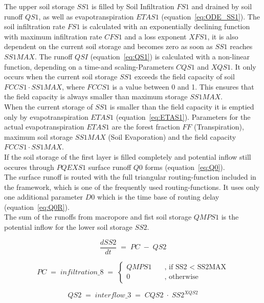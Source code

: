 \documentclass[11pt,color]{tudbook}
\begin{document}
\begin{onehalfspacing}
The upper soil storage $SS1$ is filled by Soil Infiltration $FS1$ and drained by soil runoff $QS1$, as well as evapotranspiration $ETAS1$ (equation~\ref{eq:ODE_SS1}).
The soil infiltration rate $FS1$ is calculated with an exponentially declining function with maximum infiltration rate $CFS1$ and a loss exponent $XFS1$, it is also dependent on the current soil storage and becomes zero as soon as $SS1$ reaches $SS1MAX$.
The runoff $QSI$ (equation~\ref{eq:QS1}) is  calculated with a non-linear function, depending on a time-and scaling-Parameters $CQS1$ and $XQS1$. It only occurs when the current soil storage $SS1$ exceeds the field capacity of soil $FCCS1 \cdot SS1MAX$, where $FCCS1$ is a value between 0 and 1. This ensures that the field capacity is always smaller than maximum storage $SS1MAX$.\\
When the current storage of $SS1$ is smaller than the field capacity it is emptied only by evapotranspiration $ETAS1$ (equation~\ref{eq:ETAS1}).
Parameters for the actual evapotranspiration $ETAS1$ are the forest fraction $FF$ (Transpiration), maximum soil storage $SS1MAX$ (Soil Evaporation) and the field capacity $FCCS1 \cdot SS1MAX$.\\
If the soil storage of the first layer is filled completely and potential inflow still occures through $PQEXS1$ surface runoff $Q0$ forms (equation~\ref{eq:Q0}).\\
The surface runoff is routed with the full triangular routing-function included in the framework, which is one of the frequently used routing-functions. It uses only one additional parameter $D0$ which is the time base of routing delay (equation~\ref{eq:Q0R}).\\
The sum of the runoffs from macropore and fist soil storage $QMPS1$ is the potential inflow for the lower soil storage $SS2$.


\begin{equation}
\label{eq:ODE_SS2}
\frac{dSS2}{dt}\;=\;PC\;-\;QS2
\end{equation}

\begin{equation}
\label{eq:PC}
 PC\;=\;infiltration\_8\;=\;
\begin{cases}
    QMPS1 & \quad \text{, if SS2 < SS2MAX}  \\
    0     & \quad \text{, otherwise }
  \end{cases}
\end{equation}

\begin{equation}
\label{eq:QS2}
QS2\;=\;interflow\_3\;=\;CQS2\;\cdot\;SS2^{XQS2}
\end{equation}


\end{onehalfspacing}
\end{document}
